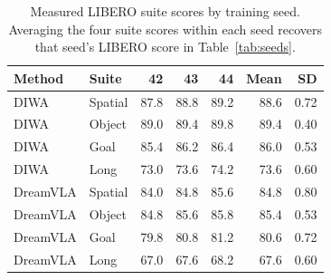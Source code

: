 \begin{table}[htbp]
\centering
\caption{Measured LIBERO suite scores by training seed. Averaging the four suite scores within each seed recovers that seed's LIBERO score in Table~\ref{tab:seeds}.}
\label{tab:suite_seeds}
\small
\begin{tabular}{llrrrrr}
\toprule
Method & Suite & 42 & 43 & 44 & Mean & SD\\
\midrule
DIWA & Spatial & 87.8 & 88.8 & 89.2 & 88.6 & 0.72\\
DIWA & Object & 89.0 & 89.4 & 89.8 & 89.4 & 0.40\\
DIWA & Goal & 85.4 & 86.2 & 86.4 & 86.0 & 0.53\\
DIWA & Long & 73.0 & 73.6 & 74.2 & 73.6 & 0.60\\
DreamVLA & Spatial & 84.0 & 84.8 & 85.6 & 84.8 & 0.80\\
DreamVLA & Object & 84.8 & 85.6 & 85.8 & 85.4 & 0.53\\
DreamVLA & Goal & 79.8 & 80.8 & 81.2 & 80.6 & 0.72\\
DreamVLA & Long & 67.0 & 67.6 & 68.2 & 67.6 & 0.60\\
\bottomrule
\end{tabular}
\end{table}
